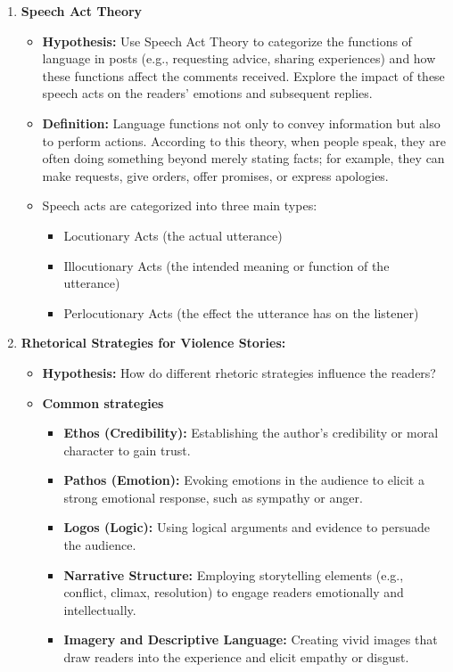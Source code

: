 \documentclass[letterpaper, 10pt]{article}
\begin{document}
\begin{enumerate}
    \item \textbf{Speech Act Theory}  
    \begin{itemize}
        \item \textbf{Hypothesis:} Use Speech Act Theory to categorize the functions of language in posts (e.g., requesting advice, sharing experiences) and how these functions affect the comments received. Explore the impact of these speech acts on the readers’ emotions and subsequent replies.
        \item \textbf{Definition:} Language functions not only to convey information but also to perform actions. According to this theory, when people speak, they are often doing something beyond merely stating facts; for example, they can make requests, give orders, offer promises, or express apologies.
        \item Speech acts are categorized into three main types: 
        \begin{itemize}
            \item Locutionary Acts (the actual utterance)
            \item Illocutionary Acts (the intended meaning or function of the utterance)
            \item Perlocutionary Acts (the effect the utterance has on the listener)
        \end{itemize}
    \end{itemize}

    \item \textbf{Rhetorical Strategies for Violence Stories:}
    \begin{itemize}
        \item \textbf{Hypothesis:} How do different rhetoric strategies influence the readers?
        \item \textbf{Common strategies} 
        \begin{itemize}
            \item \textbf{Ethos (Credibility):} Establishing the author's credibility or moral character to gain trust.
            \item \textbf{Pathos (Emotion):} Evoking emotions in the audience to elicit a strong emotional response, such as sympathy or anger.
            \item \textbf{Logos (Logic):} Using logical arguments and evidence to persuade the audience.
            \item \textbf{Narrative Structure:} Employing storytelling elements (e.g., conflict, climax, resolution) to engage readers emotionally and intellectually.
            \item \textbf{Imagery and Descriptive Language:} Creating vivid images that draw readers into the experience and elicit empathy or disgust.
        \end{itemize}
    \end{itemize}
    
\end{enumerate}
\end{document}
